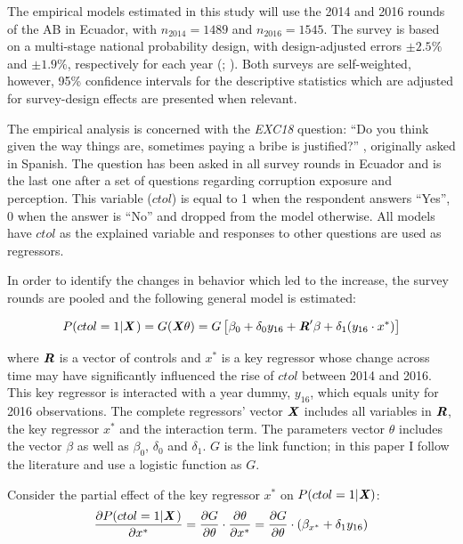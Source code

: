 \documentclass[12pt,a4]{article}\usepackage[]{graphicx}\usepackage[]{xcolor}
\begin{document}
The empirical models estimated in this study will use the 2014 and 2016 rounds of the AB in Ecuador, with $n_{2014}=1489$ and $n_{2016}= 1545$. The survey is based on a multi-stage national probability design, with design-adjusted errors $\pm 2.5\%$ and $\pm 1.9\%$, respectively for each year (\cite{LAPOP.2014}; \cite{LAPOP.2017}). Both surveys are self-weighted, however, 95\% confidence intervals for the descriptive statistics which are adjusted for survey-design effects are presented when relevant. 

The empirical analysis is concerned with the \emph{EXC18} question: \enquote{Do you think given the way things are, sometimes paying a bribe is justified?} \parencite[p.96]{Moscoso.2018}, originally asked in Spanish. The question has been asked in all survey rounds in Ecuador and is the last one after a set of questions regarding corruption exposure and perception. This variable ($ctol$) is equal to 1 when the respondent answers \enquote{Yes}, 0 when the answer is \enquote{No} and dropped from the model otherwise. All models have $ctol$ as the explained variable and responses to other questions are used as regressors. 

In order to identify the changes in behavior which led to the increase, the survey rounds are pooled and the following general model is estimated: 

\begin{equation}
\label{eqn:genmod}
P(ctol = 1 | \textbf{\textit{X}} \hspace{0.04cm}) = G (\textbf{\textit{X}} \theta ) = G \left[ \beta_0 + \delta_0 y_{16} + \textbf{\textit{R}}'\beta + \delta_1 (y_{16} \cdot x^*) \right]
\end{equation}

where $\textbf{\textit{R}}$ is a vector of controls and $x^*$ is a key regressor whose change across time may have significantly influenced the rise of $ctol$ between 2014 and 2016. This key regressor is interacted with a year dummy, $y_{16}$, which equals unity for 2016 observations. The complete regressors' vector $\textbf{\textit{X}}$ includes all variables in $\textbf{\textit{R}}$, the key regressor $x^*$ and the interaction term. The parameters vector $\theta$ includes the vector $\beta$ as well as $\beta_0$, $\delta_0$ and $\delta_1$. $G$ is the link function; in this paper I follow the literature and use a logistic function as $G$. 

Consider the partial effect of the key regressor $x^*$ on $P(ctol =1| \textbf{\textit{X}})$:
\begin{equation}
\label{eqn:keype}
\dfrac{\partial P(ctol = 1 | \textbf{\textit{X}} \hspace{0.04cm})}{\partial x^*} = \dfrac{\partial G}{\partial \theta} \cdot 
\dfrac{\partial \theta}{\partial x^*} = \dfrac{\partial G}{\partial \theta} \cdot (\beta_{x^*}+ \delta_1 y_{16})
\end{equation}
\end{document}
